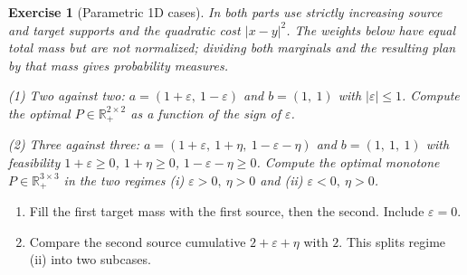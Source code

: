 \documentclass[11pt,a4paper]{article}
\theoremstyle{exostyle}
\newtheorem{exercise}{Exercise}
\newcommand{\R}{\mathbb{R}}
\begin{document}
\begin{exercise}[Parametric 1D cases]\label{ex:param}
In both parts use strictly increasing source and target supports and the quadratic cost $|x-y|^2$. The weights below have equal total mass but are not normalized; dividing both marginals and the resulting plan by that mass gives probability measures.\par (1) Two against two: $a=(1+\varepsilon,\ 1-\varepsilon)$ and $b=(1,\ 1)$ with $|\varepsilon|\le1$.
Compute the optimal $P\in\R_+^{2\times2}$ as a function of the sign of $\varepsilon$.

(2) Three against three: $a=(1+\varepsilon,\ 1+\eta,\ 1-\varepsilon-\eta)$ and $b=(1,\ 1,\ 1)$ with feasibility $1+\varepsilon\ge0$, $1+\eta\ge0$, $1-\varepsilon-\eta\ge0$.
Compute the optimal monotone $P\in\R_+^{3\times3}$ in the two regimes (i) $\varepsilon>0,\ \eta>0$ and (ii) $\varepsilon<0,\ \eta>0$.
\end{exercise}
\begin{hints}
\begin{enumerate}[label=(\arabic*)]\item Fill the first target mass with the first source, then the second. Include $\varepsilon=0$.\item Compare the second source cumulative $2+\varepsilon+\eta$ with $2$. This splits regime (ii) into two subcases.\end{enumerate}
\end{hints}
\end{document}
